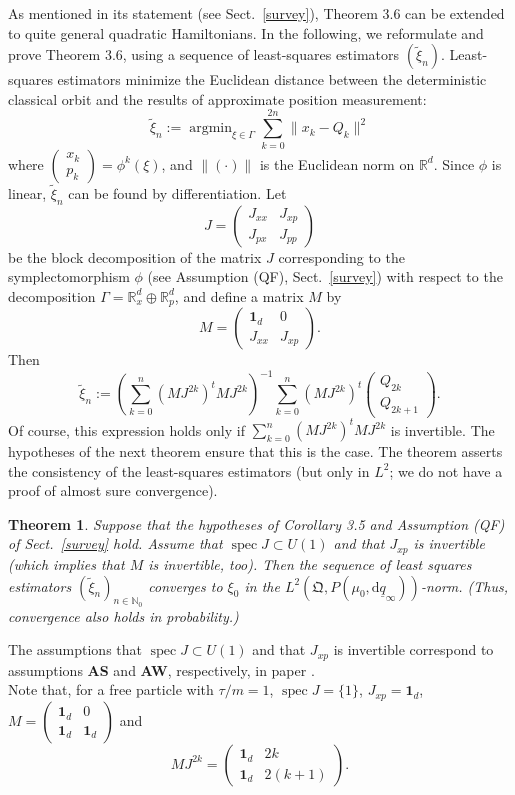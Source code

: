 \documentclass[12pt]{article}
\newtheorem{theorem}{Theorem}[section]
\begin{document}
As mentioned in its statement (see Sect.~\ref{survey}), Theorem 3.6 can be extended to quite general quadratic Hamiltonians. 
In the following, we reformulate and prove Theorem 3.6, using a sequence of least-squares estimators $(\tilde \xi_n)$. 
Least-squares estimators minimize the Euclidean distance between the deterministic classical orbit and 
the results of approximate position measurement:
$$\tilde\xi_n:=\operatorname{argmin}_{\xi\in \Gamma} \sum_{k=0}^{2n}\|x_k - Q_k\|^2$$
where $\begin{pmatrix} x_k\\ p_k\end{pmatrix}=\phi^k(\xi)$, and $\|(\cdot)\|$ is the Euclidean norm on 
$\mathbb R^d$. Since $\phi$ is linear, $\tilde\xi_n$ can be found by differentiation.
Let
    $$J=\begin{pmatrix}
        J_{xx} & J_{xp}\\ J_{px} & J_{pp}
    \end{pmatrix}$$
    be the block decomposition of the matrix $J$ corresponding to the symplectomorphism $\phi$ 
    (see Assumption (QF), Sect.~\ref{survey}) with respect to the decomposition 
    $\Gamma=\mathbb R_x^d\oplus \mathbb R_p^d$, 
    and define a matrix $M$ by
	$$M=\begin{pmatrix}
		\mathbf{1}_d &0\\
		J_{xx} & J_{xp}
	\end{pmatrix}.$$
Then
$$\tilde \xi_n:=\left(\sum_{k=0}^n(MJ^{2k})^tMJ^{2k}\right)^{-1}\sum_{k=0}^n (MJ^{2k})^t\begin{pmatrix}
	Q_{2k}\\ Q_{2k+1}
\end{pmatrix}.$$
Of course, this expression holds only if $\sum_{k=0}^n(MJ^{2k})^tMJ^{2k}$ is invertible. 
The hypotheses of the next theorem ensure that this is the case. The theorem asserts 
the consistency of the least-squares estimators (but only in $L^2$; we do not have a 
proof of almost sure convergence).
\begin{theorem}
    Suppose that the hypotheses of Corollary 3.5 and Assumption (QF) of Sect.~\ref{survey} hold. 
    Assume that $\operatorname{spec}J\subset U(1)$ and that $J_{xp}$ is invertible 
    (which implies that $M$ is invertible, too).
    Then the sequence of least squares estimators $(\tilde\xi_n)_{n\in \mathbb N_0}$ converges to $\xi_0$ in the 
    $L^2(\mathfrak{Q}, P(\mu_0,\text{d}\underline{q}_\infty))$-norm. (Thus, convergence also holds in probability.)
\end{theorem}
The assumptions that $\operatorname{spec}J\subset U(1)$ and that $J_{xp}$ is invertible correspond to assumptions {\bf AS} and {\bf AW}, respectively, in paper \cite{BBFF}.\\
Note that, for a free particle with $\tau/m=1$, $\operatorname{spec}J=\{1\}$, $J_{xp}=\mathbf{1}_d$, $M=\begin{pmatrix}
    \mathbf{1}_d & 0\\ \mathbf{1}_d &\mathbf{1}_d
\end{pmatrix}$ and
$$MJ^{2k}=\begin{pmatrix}
    \mathbf{1}_d & 2k\\ \mathbf{1}_d & 2(k+1)
\end{pmatrix}.$$
\end{document}
